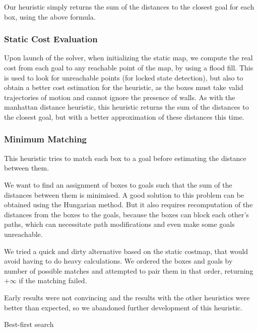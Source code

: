 \documentclass[a4paper,11pt]{article}
\begin{document}
Our heuristic simply returns the sum of the distances to the closest goal for
each box, using the above formula.

\subsubsection{Static Cost Evaluation}

Upon launch of the solver, when initializing the static map, we compute the
real cost from each goal to any reachable point of the map, by using a flood
fill. This is used to look for unreachable points (for locked state detection),
but also to obtain a better cost estimation for the heuristic, as the boxes must
take valid trajectories of motion and cannot ignore the presence of walls. As
with the manhattan distance heuristic, this heuristic returns the sum of the
distances to the closest goal, but with a better approximation of these
distances this time.

\subsubsection{Minimum Matching}

This heuristic tries to match each box to a goal before estimating the distance
between them.

We want to find an assignment of boxes to goals such that the sum of the
distances between them is minimised. A good solution to this problem can be
obtained using the Hungarian method. But it also requires recomputation of the
distances from the boxes to the goals, because the boxes can block each other's
paths, which can necessitate path modifications and even make some goals
unreachable.

We tried a quick and dirty alternative based on the static costmap, that would
avoid having to do heavy calculations. We ordered the boxes and goals by number
of possible matches and attempted to pair them in that order, returning
$+\infty$ if the matching failed.

Early results were not convincing and the results with the other heuristics were
better than expected, so we abandoned further development of this heuristic.

\begin{algorithm}
  \DontPrintSemicolon
\caption{Best-first search}
\label{alg:bestfirst}
\end{algorithm}
\end{document}
